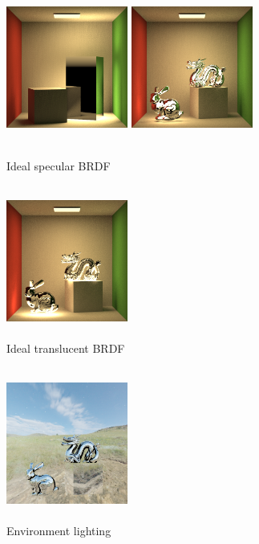 \documentclass[acmtog]{acmart}
\begin{document}
\begin{figure}[h]
	\centering
	\includegraphics[width=4cm,height=5cm]{specular}
	\includegraphics[width=4cm,height=5cm]{specular_all}
	\caption{Ideal specular BRDF}
\end{figure}

\begin{figure}[h]
	\centering
	\includegraphics[width=4cm,height=5cm]{translucent}
	\caption{Ideal translucent BRDF}
\end{figure}

\begin{figure}[h]
	\centering
	\includegraphics[width=4cm,height=5cm]{environment}
	\caption{Environment lighting}
\end{figure}
\end{document}
